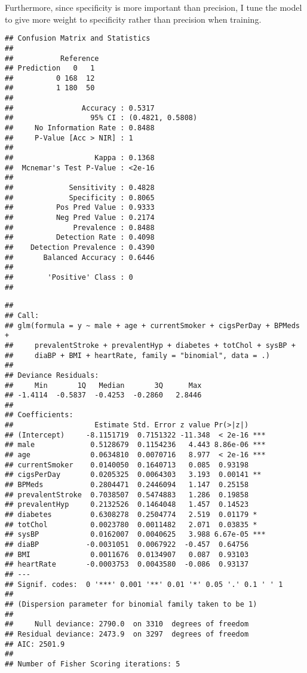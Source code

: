 \documentclass[]{article}
\begin{document}
Furthermore, since specificity is more important than precision, I tune
the model to give more weight to specificity rather than precision when
training.

\begin{verbatim}
## Confusion Matrix and Statistics
## 
##           Reference
## Prediction   0   1
##          0 168  12
##          1 180  50
##                                           
##                Accuracy : 0.5317          
##                  95% CI : (0.4821, 0.5808)
##     No Information Rate : 0.8488          
##     P-Value [Acc > NIR] : 1               
##                                           
##                   Kappa : 0.1368          
##  Mcnemar's Test P-Value : <2e-16          
##                                           
##             Sensitivity : 0.4828          
##             Specificity : 0.8065          
##          Pos Pred Value : 0.9333          
##          Neg Pred Value : 0.2174          
##              Prevalence : 0.8488          
##          Detection Rate : 0.4098          
##    Detection Prevalence : 0.4390          
##       Balanced Accuracy : 0.6446          
##                                           
##        'Positive' Class : 0               
## 
\end{verbatim}

\begin{verbatim}
## 
## Call:
## glm(formula = y ~ male + age + currentSmoker + cigsPerDay + BPMeds + 
##     prevalentStroke + prevalentHyp + diabetes + totChol + sysBP + 
##     diaBP + BMI + heartRate, family = "binomial", data = .)
## 
## Deviance Residuals: 
##     Min       1Q   Median       3Q      Max  
## -1.4114  -0.5837  -0.4253  -0.2860   2.8446  
## 
## Coefficients:
##                   Estimate Std. Error z value Pr(>|z|)    
## (Intercept)     -8.1151719  0.7151322 -11.348  < 2e-16 ***
## male             0.5128679  0.1154236   4.443 8.86e-06 ***
## age              0.0634810  0.0070716   8.977  < 2e-16 ***
## currentSmoker    0.0140050  0.1640713   0.085  0.93198    
## cigsPerDay       0.0205325  0.0064303   3.193  0.00141 ** 
## BPMeds           0.2804471  0.2446094   1.147  0.25158    
## prevalentStroke  0.7038507  0.5474883   1.286  0.19858    
## prevalentHyp     0.2132526  0.1464048   1.457  0.14523    
## diabetes         0.6308278  0.2504774   2.519  0.01179 *  
## totChol          0.0023780  0.0011482   2.071  0.03835 *  
## sysBP            0.0162007  0.0040625   3.988 6.67e-05 ***
## diaBP           -0.0031051  0.0067922  -0.457  0.64756    
## BMI              0.0011676  0.0134907   0.087  0.93103    
## heartRate       -0.0003753  0.0043580  -0.086  0.93137    
## ---
## Signif. codes:  0 '***' 0.001 '**' 0.01 '*' 0.05 '.' 0.1 ' ' 1
## 
## (Dispersion parameter for binomial family taken to be 1)
## 
##     Null deviance: 2790.0  on 3310  degrees of freedom
## Residual deviance: 2473.9  on 3297  degrees of freedom
## AIC: 2501.9
## 
## Number of Fisher Scoring iterations: 5
\end{verbatim}
\end{document}

